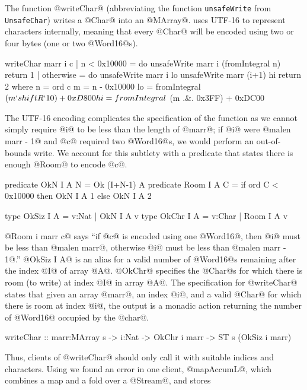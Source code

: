 The function @writeChar@ (abbreviating the function \texttt{unsafeWrite} from \texttt{UnsafeChar})
writes a @Char@ into an @MArray@.
\libtext uses UTF-16 to represent characters internally,
meaning that every @Char@ will be encoded using two or 
four bytes (one or two @Word16@s).
%
\begin{code}
  writeChar marr i c
      | n < 0x10000 = do
          unsafeWrite marr i (fromIntegral n)
          return 1
      | otherwise = do
          unsafeWrite marr i lo
          unsafeWrite marr (i+1) hi
          return 2
      where n = ord c
            m = n - 0x10000
            lo = fromIntegral
               $ (m `shiftR` 10) + 0xD800
            hi = fromIntegral
               $ (m .&. 0x3FF) + 0xDC00
\end{code}
%
The UTF-16 encoding complicates the specification of the function
as we cannot simply require @i@ to be less than the length of 
@marr@; if @i@ were @malen marr - 1@ and @c@ required two 
@Word16@s, we would perform an out-of-bounds write. 
%
We account for this subtlety with a predicate that states 
there is enough @Room@ to encode @c@.
%
\begin{code}
  predicate OkN I A N  = Ok (I+N-1) A
  predicate Room I A C = if ord C < 0x10000
                         then OkN I A 1
                         else OkN I A 2
  
  type OkSiz I A = {v:Nat  | OkN  I A v}
  type OkChr I A = {v:Char | Room I A v}
\end{code}
%
@Room i marr c@ says 
``if @c@ is encoded using one @Word16@, 
  then @i@ must be less than @malen marr@,
  otherwise @i@ must be less than @malen marr - 1@.''
%
@OkSiz I A@ is an alias for a valid number of @Word16@s 
remaining after the index @I@ of array @A@. 
@OkChr@ specifies the @Char@s for which there is room (to write)
at index @I@ in array @A@.
%
The specification for @writeChar@ states that given an array \hbox{@marr@,}
an index @i@, and a valid @Char@ for which there is room at index \hbox{@i@,}
the output is a monadic action returning the number of @Word16@ occupied
by the @char@.
%
\begin{code}
  writeChar :: marr:MArray s
            -> i:Nat
            -> OkChr i marr
            -> ST s (OkSiz i marr)
\end{code}
%
Thus, clients of @writeChar@ should only call it with suitable indices
and characters.
%
Using \toolname we found an error in one client, @mapAccumL@, 
which combines a map and a fold over a @Stream@, and stores 

